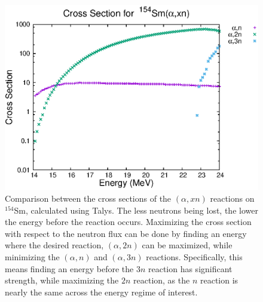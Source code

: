 \begin{figure}[t]
    \centering
    \includegraphics[scale=1]{Setup_Figs/alpha-n-comp.eps}
    \caption{Comparison between the cross sections of the $(\alpha,xn)$ reactions on $^{154}$Sm, calculated using Talys\citep{koning07:_talys}. The less neutrons being lost, the lower the energy before the reaction occurs. Maximizing the cross section with respect to the neutron flux can be done by finding an energy where the desired reaction, $(\alpha,2n)$ can be maximized, while minimizing the $(\alpha,n)$ and $(\alpha,3n)$ reactions. Specifically, this means finding an energy before the $3n$ reaction has significant strength, while maximizing the $2n$ reaction, as the $n$ reaction is nearly the same across the energy regime of interest.}
    \label{fig:alpha-neutron}
\end{figure}